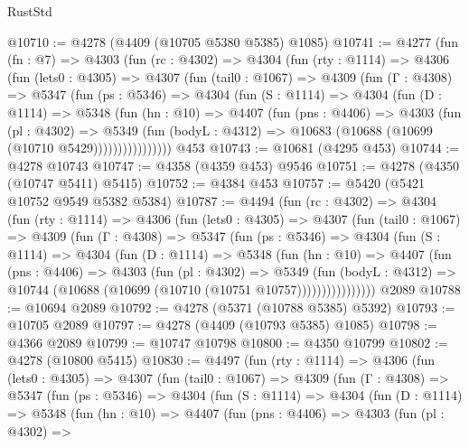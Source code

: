 \begin{lexlean}{RustStd}
\begin{coremodule}
@10710 := @4278 (@4409 (@10705 @5380 @5385) @1085)
@10741 := @4277
    (fun (fn : @7) =>
    @4303
      (fun (rc : @4302) =>
      @4304
        (fun (rty : @1114) =>
        @4306
          (fun (lets0 : @4305) =>
          @4307
            (fun (tail0 : @1067) =>
            @4309
              (fun (Γ : @4308) =>
              @5347
                (fun (ps : @5346) =>
                @4304
                  (fun (S : @1114) =>
                  @4304
                    (fun (D : @1114) =>
                    @5348
                      (fun (hn : @10) =>
                      @4407
                        (fun (pns : @4406) =>
                        @4303
                          (fun (pl : @4302) =>
                          @5349
                            (fun (bodyL : @4312) =>
                            @10683 (@10688 (@10699 (@10710 @5429))))))))))))))))
    @453
@10743 := @10681 (@4295 @453)
@10744 := @4278 @10743
@10747 := @4358 (@4359 @453) @9546
@10751 := @4278 (@4350 (@10747 @5411) @5415)
@10752 := @4384 @453
@10757 := @5420 (@5421 @10752 @9549 @5382 @5384)
@10787 := @4494
    (fun (rc : @4302) =>
    @4304
      (fun (rty : @1114) =>
      @4306
        (fun (lets0 : @4305) =>
        @4307
          (fun (tail0 : @1067) =>
          @4309
            (fun (Γ : @4308) =>
            @5347
              (fun (ps : @5346) =>
              @4304
                (fun (S : @1114) =>
                @4304
                  (fun (D : @1114) =>
                  @5348
                    (fun (hn : @10) =>
                    @4407
                      (fun (pns : @4406) =>
                      @4303
                        (fun (pl : @4302) =>
                        @5349
                          (fun (bodyL : @4312) =>
                          @10744 (@10688 (@10699 (@10710 (@10751 @10757))))))))))))))))
    @2089
@10788 := @10694 @2089
@10792 := @4278 (@5371 (@10788 @5385) @5392)
@10793 := @10705 @2089
@10797 := @4278 (@4409 (@10793 @5385) @1085)
@10798 := @4366 @2089
@10799 := @10747 @10798
@10800 := @4350 @10799
@10802 := @4278 (@10800 @5415)
@10830 := @4497
    (fun (rty : @1114) =>
    @4306
      (fun (lets0 : @4305) =>
      @4307
        (fun (tail0 : @1067) =>
        @4309
          (fun (Γ : @4308) =>
          @5347
            (fun (ps : @5346) =>
            @4304
              (fun (S : @1114) =>
              @4304
                (fun (D : @1114) =>
                @5348
                  (fun (hn : @10) =>
                  @4407
                    (fun (pns : @4406) =>
                    @4303
                      (fun (pl : @4302) =>

\end{coremodule}
\end{lexlean}
